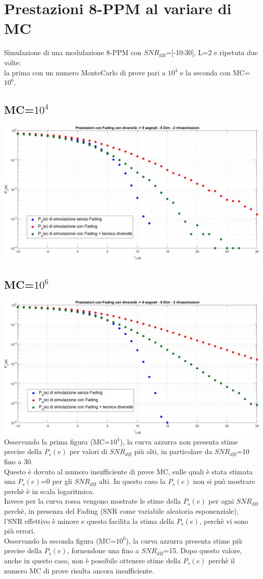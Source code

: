 \documentclass[12pt, a4paper]{article}
\begin{document}
	
	\newpage
	\section{Prestazioni 8-PPM al variare di MC}
	Simulazione di una modulazione 8-PPM con \(SNR_{dB}\)=[-10:30], L=2 e ripetuta due volte: \\la prima con un numero MonteCarlo di prove pari a \(10^4\) e la seconda con MC=\(10^6\).
	\subsection{MC=\(10^4\)}
	\centering
	\includegraphics[width=0.85\linewidth]{images/MC_104.png}
	\justify
	\subsection{MC=\(10^6\)}
	\centering
	\includegraphics[width=0.85\linewidth]{images/MC_106.png}
	\justify
	Osservando la prima figura (MC=\(10^4\)), la curva azzurra non presenta stime precise della \(P_s(e)\) per valori di \(SNR_{dB}\) più alti, in particolare da \(SNR_{dB}\)=10 fino a 30. 
	\\Questo è dovuto al numero insufficiente di prove MC, sulle quali è stata stimata una \(P_s(e)\)=0 per gli \(SNR_{dB}\) alti. In questo caso la \(P_s(e)\) non si può mostrare perchè è in scala logaritmica.
	\vspace{.3cm}\\Invece per la curva rossa vengono mostrate le stime della \(P_s(e)\) per ogni \(SNR_{dB}\) perchè, in presenza del Fading (SNR come variabile aleatoria esponenziale), l'SNR effettivo è minore e questo facilita la stima della \(P_s(e)\), perchè vi sono più errori.
	\vspace{.3cm}\\Osservando la seconda figura (MC=\(10^6\)), la curva azzurra presenta stime più precise della \(P_s(e)\), fornendone una fino a \(SNR_{dB}\)=15. Dopo questo valore, anche in questo caso, non è possibile ottenere stime della \(P_s(e)\) perchè il numero MC di prove risulta ancora insufficiente.
	
\end{document}
